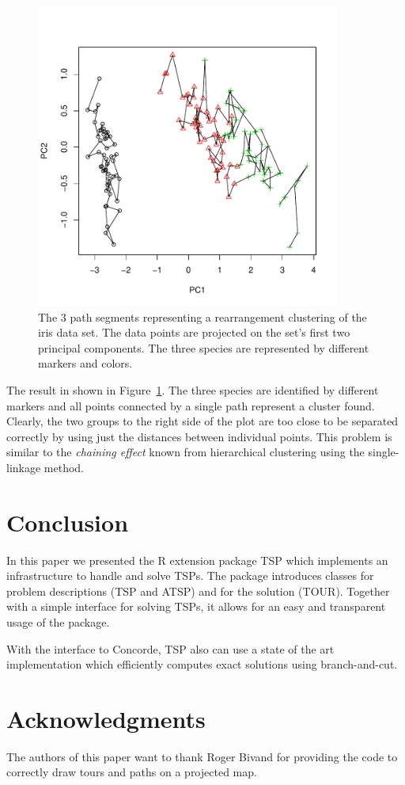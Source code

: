 \documentclass[10pt,a4paper,fleqn]{article}
\newcommand{\strong}[1]{{\normalfont\fontseries{b}\selectfont #1}}
\newcommand{\class}[1]{\mbox{\textsf{#1}}}
\newcommand{\pkg}[1]{\strong{#1}}
\begin{document}
\begin{figure}
\centering
\includegraphics[width=10cm, trim=0 20 0 0]{TSP-clustering2}
\caption{The 3 path segments representing a rearrangement clustering of the
iris data set.  The data points are projected on the set's first two principal
components.  The three species are represented by different markers and
colors.}
\label{fig:clustering2}
\end{figure}

The result in shown in Figure~\ref{fig:clustering2}.  The three species
are identified by different markers and all points connected by a single
path represent a cluster found.  Clearly, the two groups to the right
side of the plot are too close to be separated correctly by using just
the distances between individual points.  This problem is similar to the
\emph{chaining effect} known from hierarchical clustering using the
single-linkage method.

\section{Conclusion}\label{sec:conclusion}

In this paper we presented the R extension package \pkg{TSP} which
implements an infrastructure to handle and solve TSPs. The package
introduces classes for problem descriptions (\class{TSP} and
\class{ATSP}) and for the solution (\class{TOUR}).  Together with a
simple interface for solving TSPs, it allows for an easy and transparent
usage of the package.

With the interface to Concorde, \pkg{TSP} also can use a state of the
art implementation which efficiently computes exact solutions using
branch-and-cut.

\section*{Acknowledgments}

The authors of this paper want to thank Roger Bivand for providing the
code to correctly draw tours and paths on a projected map.


%


%
\end{document}
